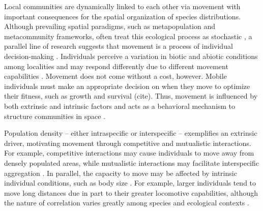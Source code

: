 \documentclass[11pt, class=article, crop=false]{standalone}
\begin{document}
Local communities are dynamically linked to each other via movement with important consequences for the spatial organization of species distributions. Although prevailing spatial paradigms, such as metapopulation and metacommunity frameworks, often treat this ecological process as stochastic \citep{thompsonProcessbasedMetacommunityFramework2020}, a parallel line of research suggests that movement is a process of individual decision-making \citep{clobertDispersalEcologyEvolution2012}. Individuals perceive a variation in biotic and abiotic conditions among localities and may respond differently due to different movement capabilities \citep{clobertDispersalEcologyEvolution2012}. Movement does not come without a cost, however. Mobile individuals must make an appropriate decision on when they move to optimize their fitness, such as growth and survival \citep{bonte} (cite). Thus, movement is influenced by both extrinsic and intrinsic factors and acts as a behavioral mechanism to structure communities in space \citep{leiboldMetacommunityConceptFramework2004, mcpeekEvolutionPassiveDispersal2024, schlagelMovementmediatedCommunityAssembly2020}. 

Population density – either intraspecific or interspecific – exemplifies an extrinsic driver, motivating movement through competitive and mutualistic interactions. For example, competitive interactions may cause individuals to move away from densely populated areas, while mutualistic interactions may facilitate interspecific aggregation \citep{thierryInterplayAbioticBiotic2024, rasmussenIndividualMovementStream2017}. In parallel, the capacity to move may be affected by intrinsic individual conditions, such as body size \citep{clobertDispersalEcologyEvolution2012}. For example,  larger individuals tend to move long distances due in part to their greater locomotive capabilities, although the nature of correlation varies greatly among species and ecological contexts \citep{comteEvidenceDispersalSyndromes, teruiParasiteInfectionInduces2017, radingerPatternsPredictorsFish2014, debeffeConditiondependentNatalDispersal2012,gilliamMovementCorridorsEnhancement2001}.
\end{document}
